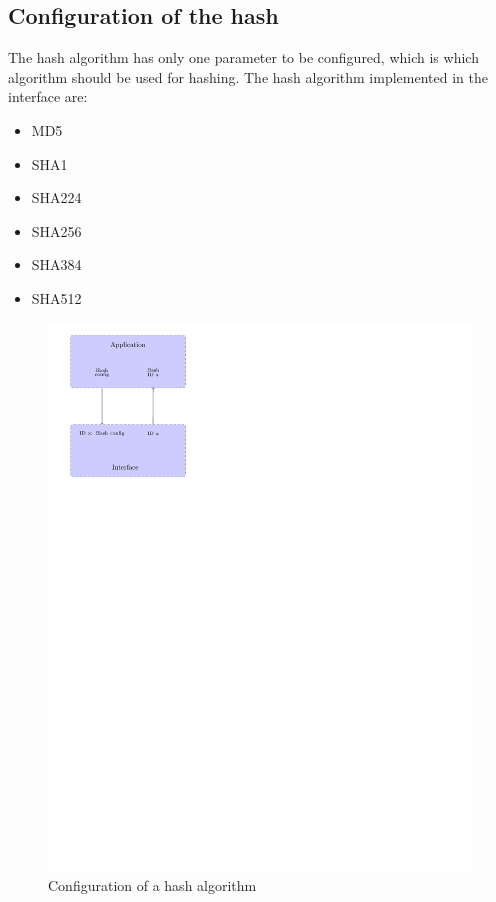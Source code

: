 \subsection*{Configuration of the hash}

The hash algorithm has only one parameter to be configured, which is which
algorithm should be used for hashing.
The hash algorithm implemented in the interface are:
\begin{itemize}[noitemsep]
  \item MD5
  \item SHA1
  \item SHA224
  \item SHA256
  \item SHA384
  \item SHA512
\end{itemize}

\begin{figure}[h]
\centering
\includegraphics[trim=0cm 20cm 13cm 0cm]{figures/hash_example_config.pdf}
\caption{Configuration of a hash algorithm}
\label{fig:gci_hash_config}
\end{figure}

